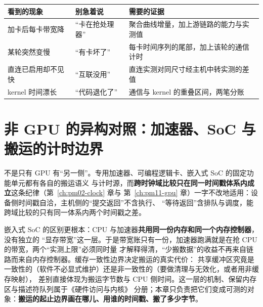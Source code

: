 \documentclass[12pt,a4paper,fontset=fandol]{ctexbook}
\begin{document}
\begin{compare}[title={多卡常见的四种错误归因与对应证据}]
\begin{tabular}{>{\raggedright\arraybackslash}p{} >{\raggedright\arraybackslash}p{} >{\raggedright\arraybackslash}p{}}
\toprule
看到的现象 & 别急着说 & 需要的证据 \\
\midrule
加卡后每卡带宽降 & ``卡在抢处理器'' & 聚合曲线增量，加上游链路的能力与实测值 \\
某轮突然变慢 & ``有卡坏了'' & 每卡时间序列的尾部，加上该轮的通信计时 \\
直连已启用却不见快 & ``互联没用'' & 直连实测对同尺寸经主机中转实测的差值 \\
kernel 时间漂长 & ``代码退化了'' & 通信与 kernel 的重叠区间，两笔分账 \\
\bottomrule
\end{tabular}
\end{compare}

\section{非 GPU 的异构对照：加速器、SoC 与搬运的计时边界}
\label{sec:pm12-hetero}

不是只有 GPU 有``另一侧''。专用加速器、可编程逻辑卡、嵌入式 SoC 的固定功能单元都有各自的搬运语义
与计时源，而\textbf{跨时钟域比较只在同一时间戳体系内成立}这条纪律（第~\ref{ch:pm02-clock} 章与
第~\ref{ch:pm11-gpu} 章）一字不改地适用：设备侧时间戳自洽，主机侧的``提交返回''不含执行、
``等待返回''含排队与调度，能跨域比较的只有同一体系内两个时间戳之差。

嵌入式 SoC 的区别更根本：CPU 与加速器\textbf{共用同一份内存和同一个内存控制器}，没有独立的
``显存带宽''这一层。于是带宽账只有一份，加速器跑满就是在抢 CPU 的带宽，两个``实测上限''必须同时量
才解释得清，``少搬数据''的收益不再来自链路而来自内存控制器。缓存一致性边界决定搬运的真实代价：
共享缓冲区究竟是一致性的（软件不必显式维护）还是非一致性的（要做清理与无效化，或者用非缓存映射），
差别直接体现为搬运字节数与 CPU 侧时间。这一层的机制、保留内存区与描述符队列属于《硬件访问与内核》
分册；本章只负责把它们变成可测的对象：\textbf{搬运的起止边界画在哪儿、用谁的时间戳、搬了多少字节}。
\end{document}
